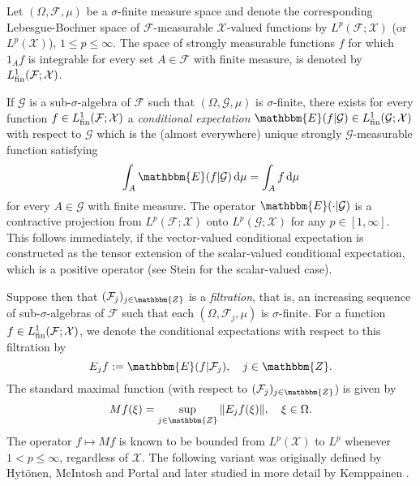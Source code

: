 \documentclass[a4paper,10pt]{amsart}
\theoremstyle{plain}
\theoremstyle{definition}
\theoremstyle{remark}
\begin{document}
Let $(\Omega , \mathcal{F} , \mu )$ be a $\sigma$-finite measure space and
denote the corresponding Lebesgue-Bochner
space of $\mathcal{F}$-measurable $\mathcal{X}$-valued functions by 
$L^p(\mathcal{F} ; \mathcal{X})$ (or $L^p(\mathcal{X})$), $1\leq p \leq \infty$.
The space of 
strongly measurable functions $f$ for which
$1_A f$ is integrable for every set $A\in\mathcal{F}$ with finite measure, is denoted by 
$L_{\textup{fin}}^1(\mathcal{F} ; \mathcal{X})$.

If $\mathcal{G}$ is a sub-$\sigma$-algebra of $\mathcal{F}$ such that $(\Omega, \mathcal{G}, \mu )$ is
$\sigma$-finite, there exists for every function $f\in L_{\textup{fin}}^1(\mathcal{F} ; \mathcal{X})$
a \emph{conditional expectation} 
${\mathbbm{E}} (f | \mathcal{G}) \in L_{\textup{fin}}^1 (\mathcal{G} ; \mathcal{X})$ with respect to $\mathcal{G}$
which is the (almost everywhere) unique strongly $\mathcal{G}$-measurable function satisfying
\begin{equation*}
  \int_A {\mathbbm{E}} (f | \mathcal{G}) {\,\text{d}}\mu = \int_A f {\,\text{d}}\mu
\end{equation*}
for every $A\in\mathcal{G}$ with finite measure. The operator ${\mathbbm{E}} ( \cdot | \mathcal{G} )$ is a contractive 
projection from $L^p(\mathcal{F} ; \mathcal{X})$ onto $L^p(\mathcal{G} ; \mathcal{X})$ for any $p\in [1,\infty ]$.
This follows immediately, if the vector-valued conditional expectation is constructed as the tensor extension of the
scalar-valued conditional expectation, which is a positive operator (see Stein
\cite{STEIN} for the scalar-valued case).

Suppose then that $(\mathcal{F}_j)_{j\in{\mathbbm{Z}}}$ is a \emph{filtration}, that is, 
an increasing sequence of sub-$\sigma$-algebras of $\mathcal{F}$ such that each $(\Omega, \mathcal{F}_j, \mu )$ is
$\sigma$-finite. For a function $f\in L_{\textup{fin}}^1(\mathcal{F} ; \mathcal{X})$, 
we denote the conditional expectations with respect to this filtration by
\begin{equation*}
  E_j f := {\mathbbm{E}} (f | \mathcal{F}_j) , \quad j\in{\mathbbm{Z}} .
\end{equation*}
The standard maximal function (with respect to $(\mathcal{F}_j)_{j\in{\mathbbm{Z}}}$) is given by
\begin{equation*}
  Mf(\xi ) = \sup_{j\in{\mathbbm{Z}}} \| E_jf(\xi ) \| , \quad \xi\in\Omega .
\end{equation*}
The operator $f \mapsto Mf$ is known to be bounded from 
$L^p(\mathcal{X})$ to $L^p$ whenever $1<p\leq\infty$, regardless of $\mathcal{X}$.
The following variant was originally defined by Hytönen, McIntosh and Portal \cite{HMP} and later studied
in more detail by Kemppainen \cite{RMF}.
\end{document}

